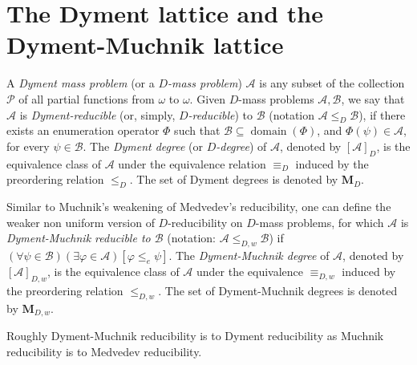 \documentclass[11pt]{amsart}
\renewcommand{\phi}{\varphi}
\DeclareMathOperator{\dom}{domain}
\newcommand{\MP}[1]{\ensuremath{\mathcal{#1}}}
\begin{document}
\section{The Dyment lattice and the Dyment-Muchnik lattice} 

A \emph{Dyment mass problem} (or a \emph{$D$-mass problem}) $\MP{A}$ is any 
subset of the collection $\MP{P}$ of all partial functions from $\omega$ to 
$\omega$.  Given $D$-mass problems $\MP{A}, \MP{B}$, we say that $\MP{A}$ is 
\emph{Dyment-reducible} (or, simply, \emph{$D$-reducible}) to  $\MP{B}$ 
(notation $\MP{A} \leq_D \MP{B}$), if there exists an enumeration operator 
$\Phi$ such that $\mathcal{B}\subseteq \dom(\Phi)$, and $\Phi(\psi) \in 
\mathcal{A}$, for every $\psi \in \MP{B}$. The \emph{Dyment degree} (or 
\emph{$D$-degree}) of $\MP{A}$, denoted by $[\MP{A}]_{D}$, is the equivalence 
class of $\MP{A}$ under the equivalence relation $\equiv_{D}$ induced by the 
preordering relation $\le_{D}$. The set of Dyment degrees is denoted by 
$\textbf{M}_{D}$. 

Similar to Muchnik's weakening of Medvedev's reducibility, one can define the 
weaker non uniform version of $D$-reducibility on $D$-mass  problems, for 
which $\MP{A}$ is \emph{Dyment-Muchnik reducible to $\MP{B}$} (notation: 
$\MP{A}\leq_{D,w} \MP{B}$) if $(\forall \psi \in \MP{B})(\exists \phi \in 
\MP{A})[\phi \leq_{e} \psi]$.  The \emph{Dyment-Muchnik degree} of $\MP{A}$, 
denoted by $[\MP{A}]_{D,w}$, is the equivalence class of $\MP{A}$ under the 
equivalence $\equiv_{D,w}$ induced by the preordering relation $\le_{D,w}$. 
The set of Dyment-Muchnik degrees is denoted by $\textbf{M}_{D,w}$. 

Roughly Dyment-Muchnik reducibility is to Dyment reducibility as Muchnik 
reducibility is to Medvedev reducibility. 
\end{document}
